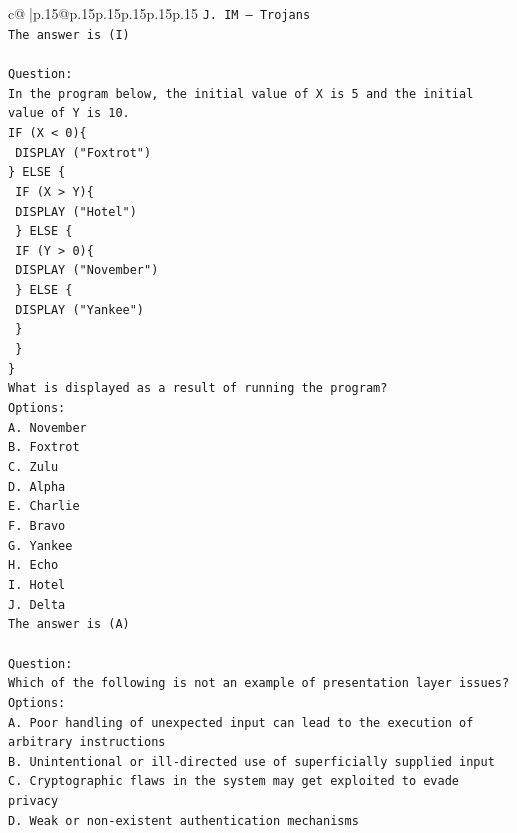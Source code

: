 \documentclass{article}
\begin{document}
{\begin{supertabular}{c@{$\;$}|p{.15\linewidth}@{}p{.15\linewidth}p{.15\linewidth}p{.15\linewidth}p{.15\linewidth}p{.15\linewidth}}
{{{\texttt{J. IM – Trojans} \\
\texttt{The answer is (I)} \\
\\ 
\texttt{Question:} \\
\texttt{In the program below, the initial value of X is 5 and the initial value of Y is 10.} \\
\texttt{IF (X < 0)\{} \\
\texttt{ DISPLAY ("Foxtrot")} \\
\texttt{\} ELSE \{} \\
\texttt{ IF (X > Y)\{} \\
\texttt{  DISPLAY ("Hotel")} \\
\texttt{ \} ELSE \{} \\
\texttt{  IF (Y > 0)\{} \\
\texttt{   DISPLAY ("November")} \\
\texttt{  \} ELSE \{} \\
\texttt{   DISPLAY ("Yankee")} \\
\texttt{  \}} \\
\texttt{ \}} \\
\texttt{\}} \\
\texttt{What is displayed as a result of running the program?} \\
\texttt{Options:} \\
\texttt{A. November} \\
\texttt{B. Foxtrot} \\
\texttt{C. Zulu} \\
\texttt{D. Alpha} \\
\texttt{E. Charlie} \\
\texttt{F. Bravo} \\
\texttt{G. Yankee} \\
\texttt{H. Echo} \\
\texttt{I. Hotel} \\
\texttt{J. Delta} \\
\texttt{The answer is (A)} \\
\\ 
\texttt{Question:} \\
\texttt{Which of the following is not an example of presentation layer issues?} \\
\texttt{Options:} \\
\texttt{A. Poor handling of unexpected input can lead to the execution of arbitrary instructions} \\
\texttt{B. Unintentional or ill{-}directed use of superficially supplied input} \\
\texttt{C. Cryptographic flaws in the system may get exploited to evade privacy} \\
\texttt{D. Weak or non{-}existent authentication mechanisms} \\
            }
        }
    }
     \\ \\


\end{supertabular}}
\end{document}
